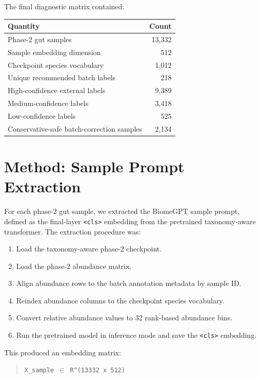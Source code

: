 \documentclass[11pt]{article}
\newcommand{\code}[1]{\texttt{\small #1}}
\begin{document}
The final diagnostic matrix contained:

\begin{center}
\begin{tabular}{lr}
\toprule
Quantity & Count \\
\midrule
Phase-2 gut samples & 13,332 \\
Sample embedding dimension & 512 \\
Checkpoint species vocabulary & 1,012 \\
Unique recommended batch labels & 218 \\
High-confidence external labels & 9,389 \\
Medium-confidence labels & 3,418 \\
Low-confidence labels & 525 \\
Conservative-safe batch-correction samples & 2,134 \\
\bottomrule
\end{tabular}
\end{center}

\section{Method: Sample Prompt Extraction}

For each phase-2 gut sample, we extracted the BiomeGPT sample prompt, defined as the
final-layer \code{<cls>} embedding from the pretrained taxonomy-aware transformer.
The extraction procedure was:

\begin{enumerate}
  \item Load the taxonomy-aware phase-2 checkpoint.
  \item Load the phase-2 abundance matrix.
  \item Align abundance rows to the batch annotation metadata by sample ID.
  \item Reindex abundance columns to the checkpoint species vocabulary.
  \item Convert relative abundance values to 32 rank-based abundance bins.
  \item Run the pretrained model in inference mode and save the \code{<cls>} embedding.
\end{enumerate}

This produced an embedding matrix:

\begin{quote}
\code{X\_sample \(\in\) R\^{}(13332 x 512)}
\end{quote}
\end{document}
